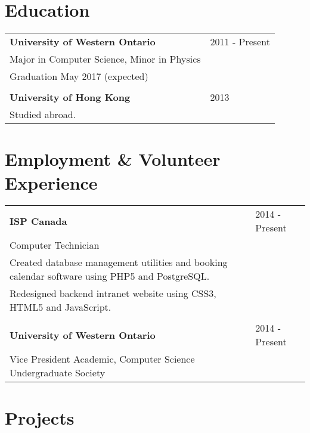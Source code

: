 \documentclass{article}
\def \resumeitem {\bf}
\def \resumedate {}
\def \resumedetails {\small}
\begin{document}
\begin{minipage}[t]{0.7\hsize} %
	
	\section{Education}
	
		\begin{tabular}{p{}p{}}
			\resumeitem{University of Western Ontario} & \resumedate{2011 - Present}\\
			Major in Computer Science, Minor in Physics &\\
			\resumedetails{Graduation May 2017 (expected)} &\\
			\\
			\resumeitem{University of Hong Kong} & \resumedate{2013}\\
			Studied abroad. &
		\end{tabular}
		
	\vspace{7mm}
	
	\section{Employment \& Volunteer Experience}
	
		\begin{tabular}{p{}p{}}
			\resumeitem{ISP Canada} & \resumedate{2014 - Present}\\
			Computer Technician &\\
			\resumedetails{Created database management utilities and booking calendar software using PHP5 and PostgreSQL.} &\\
			\resumedetails{Redesigned backend intranet website using CSS3, HTML5 and JavaScript.} &\\
			&\\
			\resumeitem{University of Western Ontario} & \resumedate{2014 - Present}\\
			Vice President Academic, Computer Science Undergraduate Society &\\
		\end{tabular}
	
	\vspace{7mm}
	
	\section{Projects}
	

\end{minipage}
\end{document}
